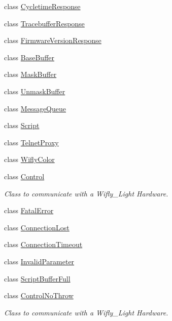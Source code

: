 \begin{DoxyCompactItemize}
\item 
class \hyperlink{class_wy_light_1_1_cycletime_response}{Cycletime\-Response}
\item 
class \hyperlink{class_wy_light_1_1_tracebuffer_response}{Tracebuffer\-Response}
\item 
class \hyperlink{class_wy_light_1_1_firmware_version_response}{Firmware\-Version\-Response}
\item 
class \hyperlink{class_wy_light_1_1_base_buffer}{Base\-Buffer}
\item 
class \hyperlink{class_wy_light_1_1_mask_buffer}{Mask\-Buffer}
\item 
class \hyperlink{class_wy_light_1_1_unmask_buffer}{Unmask\-Buffer}
\item 
class \hyperlink{class_wy_light_1_1_message_queue}{Message\-Queue}
\item 
class \hyperlink{class_wy_light_1_1_script}{Script}
\item 
class \hyperlink{class_wy_light_1_1_telnet_proxy}{Telnet\-Proxy}
\item 
class \hyperlink{class_wy_light_1_1_wifly_color}{Wifly\-Color}
\item 
class \hyperlink{class_wy_light_1_1_control}{Control}
\begin{DoxyCompactList}\small\item\em Class to communicate with a Wifly\-\_\-\-Light Hardware. \end{DoxyCompactList}\item 
class \hyperlink{class_wy_light_1_1_fatal_error}{Fatal\-Error}
\item 
class \hyperlink{class_wy_light_1_1_connection_lost}{Connection\-Lost}
\item 
class \hyperlink{class_wy_light_1_1_connection_timeout}{Connection\-Timeout}
\item 
class \hyperlink{class_wy_light_1_1_invalid_parameter}{Invalid\-Parameter}
\item 
class \hyperlink{class_wy_light_1_1_script_buffer_full}{Script\-Buffer\-Full}
\item 
class \hyperlink{class_wy_light_1_1_control_no_throw}{Control\-No\-Throw}
\begin{DoxyCompactList}\small\item\em Class to communicate with a Wifly\-\_\-\-Light Hardware. \end{DoxyCompactList}\end{DoxyCompactItemize}
